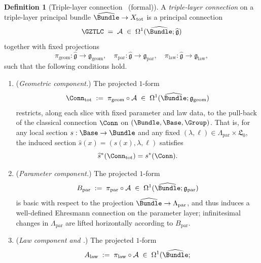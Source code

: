 \documentclass[11pt]{book}
\theoremstyle{plain}
\theoremstyle{definition}
\newtheorem{definition}[theorem]{Definition} \theoremstyle{remark}
\begin{document}
\begin{definition}[Triple-layer connection \GZTLC\ (formal)]
  A \emph{triple-layer connection} on a triple-layer principal bundle
  $\widehat{\Bundle}\to X_{\mathrm{tot}}$ is a principal connection
  \[
     \GZTLC
     \;=\;
     \mathcal{A}
     \;\in\;
     \Omega^1(\widehat{\Bundle};\widehat{\mathfrak{g}})
  \]
  together with fixed projections
  \[
     \pi_{\mathrm{geom}}:
       \widehat{\mathfrak{g}}\to\mathfrak{g}_{\mathrm{geom}},\quad
     \pi_{\mathrm{par}}:
       \widehat{\mathfrak{g}}\to\mathfrak{g}_{\mathrm{par}},\quad
     \pi_{\mathrm{law}}:
       \widehat{\mathfrak{g}}\to\mathfrak{g}_{\mathrm{law}},
  \]
  such that the following conditions hold.
  \begin{enumerate}[label=\roman*)]
    \item (\emph{Geometric component.})
          The projected $1$-form
          \[
             \Conn_{\mathrm{tot}}
             \;:=\;
             \pi_{\mathrm{geom}}\circ\mathcal{A}
             \;\in\;
             \Omega^1(\widehat{\Bundle};
                      \mathfrak{g}_{\mathrm{geom}})
          \]
          restricts, along each slice with fixed parameter and law data,
          to the pull-back of the classical connection $\Conn$ on
          $(\Bundle,\Base,\Group)$. That is, for any local section
          $s:\Base\to\Bundle$ and any fixed
          $(\lambda,\ell)\in
             \Lambda_{\mathrm{par}}\times\mathfrak{L}_0$,
          the induced section
          $\widehat{s}(x)=(s(x),\lambda,\ell)$ satisfies
          \[
             \widehat{s}^*(\Conn_{\mathrm{tot}})=s^*(\Conn).
          \]
    \item (\emph{Parameter component.})
          The projected $1$-form
          \[
             B_{\mathrm{par}}
             \;:=\;
             \pi_{\mathrm{par}}\circ\mathcal{A}
             \;\in\;
             \Omega^1(\widehat{\Bundle};
                      \mathfrak{g}_{\mathrm{par}})
          \]
          is basic with respect to the projection
          $\widehat{\Bundle}\to\Lambda_{\mathrm{par}}$, and thus
          induces a well-defined Ehresmann connection on the parameter
          layer; infinitesimal changes in $\Lambda_{\mathrm{par}}$ are
          lifted horizontally according to $B_{\mathrm{par}}$.
    \item (\emph{Law component and \GZLOC.})
          The projected $1$-form
          \[
             A_{\mathrm{law}}
             \;:=\;
             \pi_{\mathrm{law}}\circ\mathcal{A}
             \;\in\;
             \Omega^1(\widehat{\Bundle};
\]
\end{enumerate}
\end{definition}
\end{document}
